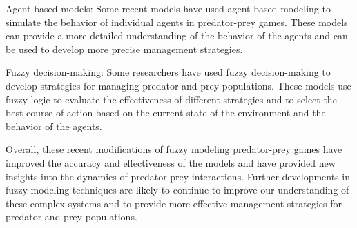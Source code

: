 Agent-based models: Some recent models have used agent-based modeling to simulate the behavior of individual agents in predator-prey games. These models can provide a more detailed understanding of the behavior of the agents and can be used to develop more precise management strategies.

Fuzzy decision-making: Some researchers have used fuzzy decision-making to develop strategies for managing predator and prey populations. These models use fuzzy logic to evaluate the effectiveness of different strategies and to select the best course of action based on the current state of the environment and the behavior of the agents.

Overall, these recent modifications of fuzzy modeling predator-prey games have improved the accuracy and effectiveness of the models and have provided new insights into the dynamics of predator-prey interactions. Further developments in fuzzy modeling techniques are likely to continue to improve our understanding of these complex systems and to provide more effective management strategies for predator and prey populations.
